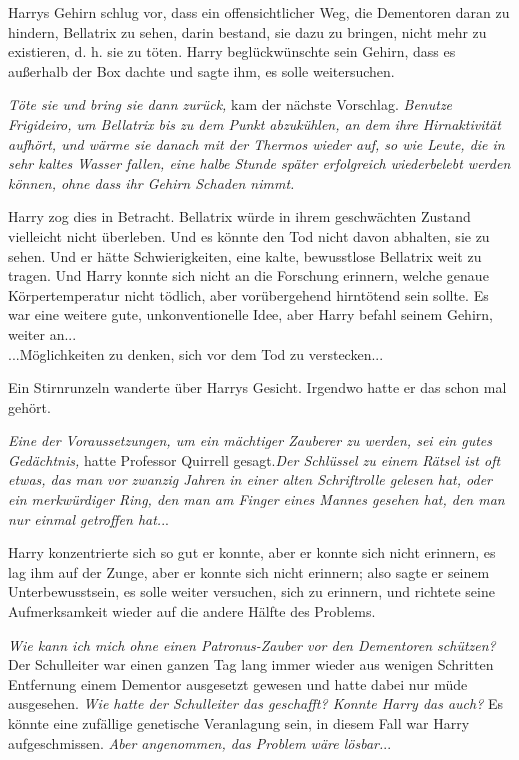 {Harrys Gehirn schlug vor, dass ein offensichtlicher Weg, die Dementoren daran zu hindern, Bellatrix zu sehen, darin bestand, sie dazu zu bringen, nicht mehr zu existieren, d. h. sie zu töten. Harry beglückwünschte sein Gehirn, dass es außerhalb der Box dachte und sagte ihm, es solle weitersuchen.

\emph{Töte sie und bring sie dann zurück,} kam der nächste Vorschlag. \emph{Benutze Frigideiro, um Bellatrix bis zu dem Punkt abzukühlen, an dem ihre Hirnaktivität aufhört, und wärme sie danach mit der Thermos wieder auf, so wie Leute, die in sehr kaltes Wasser fallen, eine halbe Stunde später erfolgreich wiederbelebt werden können, ohne dass ihr Gehirn Schaden nimmt.}

Harry zog dies in Betracht. Bellatrix würde in ihrem geschwächten Zustand vielleicht nicht überleben. Und es könnte den Tod nicht davon abhalten, sie zu sehen. Und er hätte Schwierigkeiten, eine kalte, bewusstlose Bellatrix weit zu tragen. Und Harry konnte sich nicht an die Forschung erinnern, welche genaue Körpertemperatur nicht tödlich, aber vorübergehend hirntötend sein sollte. Es war eine weitere gute, unkonventionelle Idee, aber Harry befahl seinem Gehirn, weiter an...\\ ...Möglichkeiten zu denken, sich vor dem Tod zu verstecken...

Ein Stirnrunzeln wanderte über Harrys Gesicht. Irgendwo hatte er das schon mal gehört.

\emph{Eine der Voraussetzungen, um ein mächtiger Zauberer zu werden, sei ein gutes Gedächtnis,} hatte Professor Quirrell gesagt.\emph{\hfill\break Der Schlüssel zu einem Rätsel ist oft etwas, das man vor zwanzig Jahren in einer alten Schriftrolle gelesen hat, oder ein merkwürdiger Ring, den man am Finger eines Mannes gesehen hat, den man nur einmal getroffen hat.}..

Harry konzentrierte sich so gut er konnte, aber er konnte sich nicht erinnern, es lag ihm auf der Zunge, aber er konnte sich nicht erinnern; also sagte er seinem Unterbewusstsein, es solle weiter versuchen, sich zu erinnern, und richtete seine Aufmerksamkeit wieder auf die andere Hälfte des Problems.

\emph{Wie kann ich mich ohne einen Patronus-Zauber vor den Dementoren schützen?}\\ Der Schulleiter war einen ganzen Tag lang immer wieder aus wenigen Schritten Entfernung einem Dementor ausgesetzt gewesen und hatte dabei nur müde ausgesehen. \emph{Wie hatte der Schulleiter das geschafft? Konnte Harry das auch?} Es könnte eine zufällige genetische Veranlagung sein, in diesem Fall war Harry aufgeschmissen. \emph{Aber angenommen, das Problem wäre lösbar.}..

}
